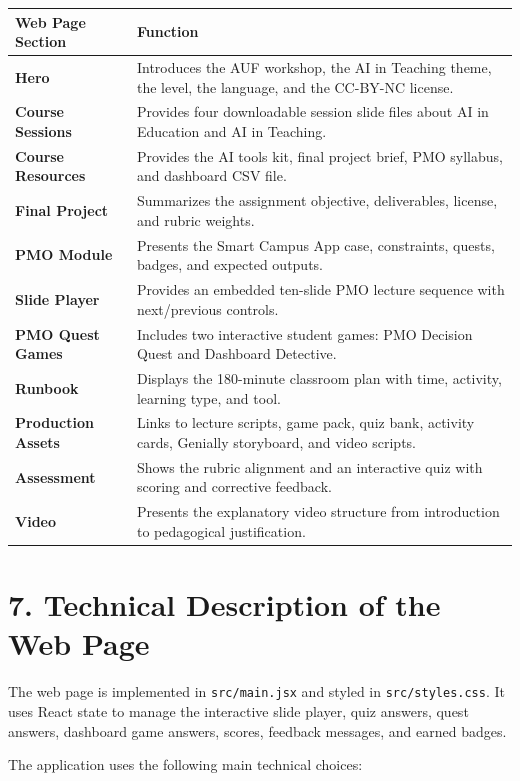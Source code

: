 \documentclass[11pt,a4paper]{article}
\begin{document}
\begin{longtable}{>{\bfseries}p{4cm}p{10.5cm}}
\textbf{Web Page Section} & \textbf{Function} \\
\hline
Hero & Introduces the AUF workshop, the AI in Teaching theme, the level, the language, and the CC-BY-NC license. \\
Course Sessions & Provides four downloadable session slide files about AI in Education and AI in Teaching. \\
Course Resources & Provides the AI tools kit, final project brief, PMO syllabus, and dashboard CSV file. \\
Final Project & Summarizes the assignment objective, deliverables, license, and rubric weights. \\
PMO Module & Presents the Smart Campus App case, constraints, quests, badges, and expected outputs. \\
Slide Player & Provides an embedded ten-slide PMO lecture sequence with next/previous controls. \\
PMO Quest Games & Includes two interactive student games: PMO Decision Quest and Dashboard Detective. \\
Runbook & Displays the 180-minute classroom plan with time, activity, learning type, and tool. \\
Production Assets & Links to lecture scripts, game pack, quiz bank, activity cards, Genially storyboard, and video scripts. \\
Assessment & Shows the rubric alignment and an interactive quiz with scoring and corrective feedback. \\
Video & Presents the explanatory video structure from introduction to pedagogical justification. \\
\end{longtable}

\section*{7. Technical Description of the Web Page}

The web page is implemented in \texttt{src/main.jsx} and styled in \texttt{src/styles.css}. It uses React state to manage the interactive slide player, quiz answers, quest answers, dashboard game answers, scores, feedback messages, and earned badges.

The application uses the following main technical choices:
\end{document}

